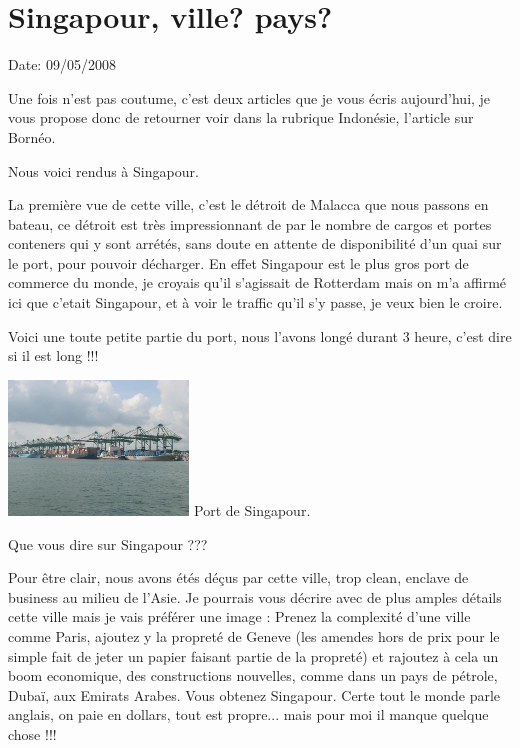 \section{Singapour, ville? pays?}

Date: 09/05/2008

\begin{multicols}{2}

Une fois n'est pas coutume, c'est deux articles que je vous écris aujourd'hui, je vous propose donc de retourner voir dans la rubrique Indonésie, l'article sur Bornéo.

Nous voici rendus à Singapour.

La première vue de cette ville, c'est le détroit de Malacca que nous passons en bateau, ce détroit est très impressionnant de par le nombre de cargos et portes conteners qui y sont arrétés, sans doute en attente de disponibilité d'un quai sur le port, pour pouvoir décharger. En effet Singapour est le plus gros port de commerce du monde, je croyais qu'il s'agissait de Rotterdam mais on m'a affirmé ici que c'etait Singapour, et à voir le traffic qu'il s'y passe, je veux bien le croire.


Voici une toute petite partie du port, nous l'avons longé durant 3 heure, c'est dire si il est long !!!

\hspace*{-0.65cm}
\includegraphics[width=4.8cm]{articles/Singapour-ville-pays/1210333644359c.jpg}
Port de Singapour.

Que vous dire sur Singapour ???

Pour être clair, nous avons étés déçus par cette ville, trop clean, enclave de business au milieu de l'Asie. Je pourrais vous décrire avec de plus amples détails cette ville mais je vais préférer une image : Prenez la complexité d'une ville comme Paris, ajoutez y la propreté de Geneve (les amendes hors de prix pour le simple fait de jeter un papier faisant partie de la propreté) et rajoutez à cela un boom economique, des constructions nouvelles, comme dans un pays de pétrole, Dubaï, aux Emirats Arabes. Vous obtenez Singapour. Certe tout le monde parle anglais, on paie en dollars, tout est propre... mais pour moi il manque quelque chose !!!


\end{multicols}
